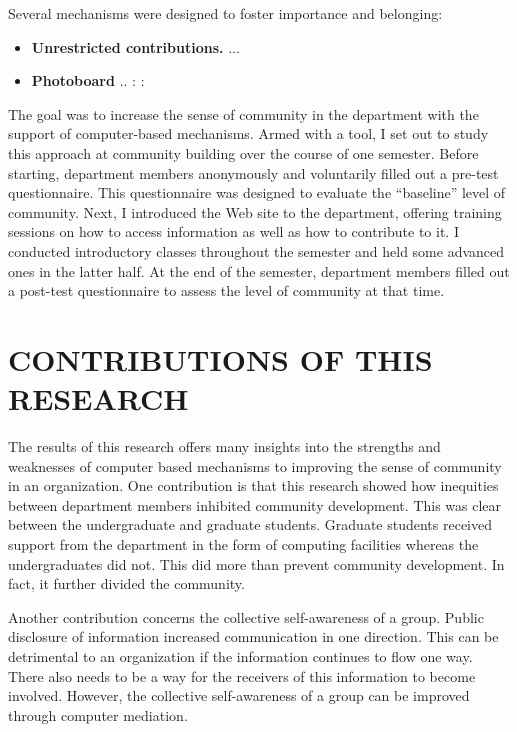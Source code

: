 Several mechanisms were designed to foster importance and belonging:
  \begin{itemize}
     \item {\bf Unrestricted contributions.} ...
     \item {\bf Photoboard} ..
       :
       :
  \end{itemize}

The goal was to increase the sense of community in the department with the
support of computer-based mechanisms.  Armed with a tool, I set out to study
this approach at community building over the course of one semester.  Before
starting, department members anonymously and voluntarily filled out a pre-test
questionnaire.  This questionnaire was designed to evaluate the ``baseline''
level of community.  Next, I introduced the Web site to the department,
offering training sessions on how to access information as well as how to
contribute to it.  I conducted introductory classes throughout the semester and
held some advanced ones in the latter half.  At the end of the semester,
department members filled out a post-test questionnaire to assess the level of
community at that time.


\section{CONTRIBUTIONS OF THIS RESEARCH}
The results of this research offers many insights into the strengths and
weaknesses of computer based mechanisms to improving the sense of community in
an organization.  One contribution is that this research showed how inequities
between department members inhibited community development.  This was clear
between the undergraduate and graduate students.  Graduate students received
support from the department in the form of computing facilities whereas the
undergraduates did not.  This did more than prevent community development.  In
fact, it further divided the community.

Another contribution concerns the collective self-awareness of a group.  Public
disclosure of information increased communication in one direction.  This can
be detrimental to an organization if the information continues to flow one way.
There also needs to be a way for the receivers of this information to become
involved.  However, the collective self-awareness of a group can be improved
through computer mediation.


